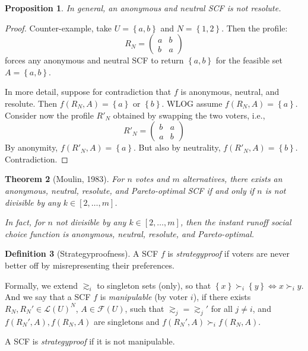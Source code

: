 \documentclass{book}
\theoremstyle{plain}
\newtheorem{theorem}{Theorem}[subsection]
\newtheorem{proposition}[theorem]{Proposition}
\theoremstyle{definition}
\newtheorem{definition}[theorem]{Definition}
\theoremstyle{remark}
\newcommand{\set}[1]{\left\{#1\right\}}
\begin{document}
\begin{proposition}
    In general, an anonymous and neutral SCF is not resolute.
\end{proposition}
\begin{proof}
    Counter-example, take $U = \set{a, b}$ and $N = \set{1, 2}$.
    Then the profile:
    \[
        R_N = \begin{pmatrix}
            a & b \\
            b & a
        \end{pmatrix}
    \]
    forces any anonymous and neutral SCF to return $\set{a, b}$ for the feasible set $A = \set{a, b}$.

    In more detail, 
    suppose for contradiction that $f$ is 
    anonymous, neutral, and resolute.
    Then $f(R_N, A) = \set{a}$ or $\set{b}$.
    WLOG assume $f(R_N, A) = \set{a}$.
    Consider now the profile $R'_N$ obtained by swapping the two voters, i.e.,
    \[
        R'_N = \begin{pmatrix}
            b & a \\
            a & b
        \end{pmatrix}
    \]
    By anonymity, $f(R'_N, A) = \set{a}$.
    But also by neutrality, $f(R'_N, A) = \set{b}$.
    Contradiction.
\end{proof}


\begin{theorem}[Moulin, 1983]
    For $n$ votes and $m$ alternatives, 
    there exists an 
    anonymous, neutral, resolute, and 
    Pareto-optimal SCF if and only if $n$ is not divisible by 
    any $k \in [2, \dots, m]$.

    In fact, 
    for $n$ not divisible by any $k \in [2, \dots, m]$,
    then the \emph{instant runoff} social choice function is 
    anonymous, neutral, resolute, and Pareto-optimal.
\end{theorem}


\begin{definition}[Strategyproofness]
    A SCF $f$ is \emph{strategyproof} if voters are never better off by misrepresenting their 
    preferences.

    Formally, we extend $\gtrsim_i$ to singleton sets (only), 
    so that $\set{x} \succ_i \set{y} \iff x \succ_i y$.
    And we say that 
    a SCF $f$ is \emph{manipulable} (by voter $i$), if there exists 
    $R_N, R_N'\in \mathcal{L}(U)^N$, $A \in \mathcal{F}(U)$,
    such that $\gtrsim_j = \gtrsim_j'$ for all $j \neq i$,
    and $f(R_N', A), f(R_N, A)$ are singletons and 
    $f(R_N', A) \succ_i f(R_N, A)$.

    A SCF is \emph{strategyproof} if it is not manipulable.
\end{definition}
\end{document}
